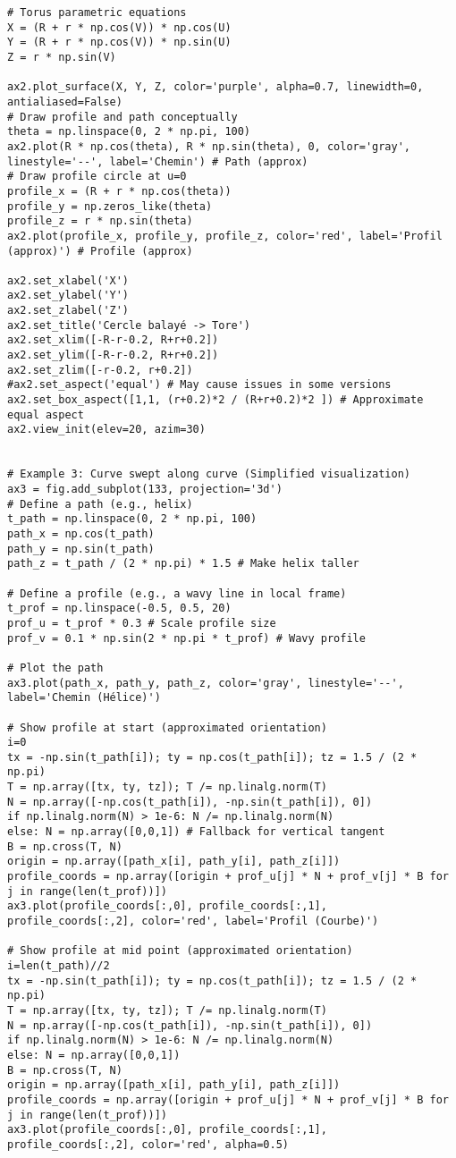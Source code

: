 \documentclass{article}
\begin{document}
\begin{verbatim}
# Torus parametric equations
X = (R + r * np.cos(V)) * np.cos(U)
Y = (R + r * np.cos(V)) * np.sin(U)
Z = r * np.sin(V)

ax2.plot_surface(X, Y, Z, color='purple', alpha=0.7, linewidth=0, antialiased=False)
# Draw profile and path conceptually
theta = np.linspace(0, 2 * np.pi, 100)
ax2.plot(R * np.cos(theta), R * np.sin(theta), 0, color='gray', linestyle='--', label='Chemin') # Path (approx)
# Draw profile circle at u=0
profile_x = (R + r * np.cos(theta))
profile_y = np.zeros_like(theta)
profile_z = r * np.sin(theta)
ax2.plot(profile_x, profile_y, profile_z, color='red', label='Profil (approx)') # Profile (approx)

ax2.set_xlabel('X')
ax2.set_ylabel('Y')
ax2.set_zlabel('Z')
ax2.set_title('Cercle balayé -> Tore')
ax2.set_xlim([-R-r-0.2, R+r+0.2])
ax2.set_ylim([-R-r-0.2, R+r+0.2])
ax2.set_zlim([-r-0.2, r+0.2])
#ax2.set_aspect('equal') # May cause issues in some versions
ax2.set_box_aspect([1,1, (r+0.2)*2 / (R+r+0.2)*2 ]) # Approximate equal aspect
ax2.view_init(elev=20, azim=30)


# Example 3: Curve swept along curve (Simplified visualization)
ax3 = fig.add_subplot(133, projection='3d')
# Define a path (e.g., helix)
t_path = np.linspace(0, 2 * np.pi, 100)
path_x = np.cos(t_path)
path_y = np.sin(t_path)
path_z = t_path / (2 * np.pi) * 1.5 # Make helix taller

# Define a profile (e.g., a wavy line in local frame)
t_prof = np.linspace(-0.5, 0.5, 20)
prof_u = t_prof * 0.3 # Scale profile size
prof_v = 0.1 * np.sin(2 * np.pi * t_prof) # Wavy profile

# Plot the path
ax3.plot(path_x, path_y, path_z, color='gray', linestyle='--', label='Chemin (Hélice)')

# Show profile at start (approximated orientation)
i=0
tx = -np.sin(t_path[i]); ty = np.cos(t_path[i]); tz = 1.5 / (2 * np.pi)
T = np.array([tx, ty, tz]); T /= np.linalg.norm(T)
N = np.array([-np.cos(t_path[i]), -np.sin(t_path[i]), 0])
if np.linalg.norm(N) > 1e-6: N /= np.linalg.norm(N)
else: N = np.array([0,0,1]) # Fallback for vertical tangent
B = np.cross(T, N)
origin = np.array([path_x[i], path_y[i], path_z[i]])
profile_coords = np.array([origin + prof_u[j] * N + prof_v[j] * B for j in range(len(t_prof))])
ax3.plot(profile_coords[:,0], profile_coords[:,1], profile_coords[:,2], color='red', label='Profil (Courbe)')

# Show profile at mid point (approximated orientation)
i=len(t_path)//2
tx = -np.sin(t_path[i]); ty = np.cos(t_path[i]); tz = 1.5 / (2 * np.pi)
T = np.array([tx, ty, tz]); T /= np.linalg.norm(T)
N = np.array([-np.cos(t_path[i]), -np.sin(t_path[i]), 0])
if np.linalg.norm(N) > 1e-6: N /= np.linalg.norm(N)
else: N = np.array([0,0,1])
B = np.cross(T, N)
origin = np.array([path_x[i], path_y[i], path_z[i]])
profile_coords = np.array([origin + prof_u[j] * N + prof_v[j] * B for j in range(len(t_prof))])
ax3.plot(profile_coords[:,0], profile_coords[:,1], profile_coords[:,2], color='red', alpha=0.5)



\end{verbatim}
\end{document}
